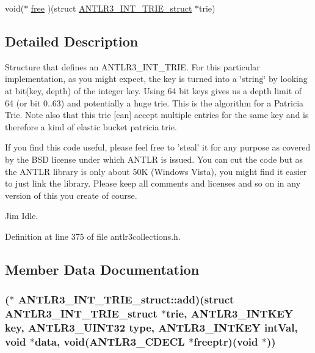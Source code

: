 \begin{DoxyCompactItemize}
\item 
void($\ast$ \hyperlink{struct_a_n_t_l_r3___i_n_t___t_r_i_e__struct_a3b80efe15e4309b61038feb16abc9e75}{free} )(struct \hyperlink{struct_a_n_t_l_r3___i_n_t___t_r_i_e__struct}{A\-N\-T\-L\-R3\-\_\-\-I\-N\-T\-\_\-\-T\-R\-I\-E\-\_\-struct} $\ast$trie)
\end{DoxyCompactItemize}


\subsection{Detailed Description}
Structure that defines an A\-N\-T\-L\-R3\-\_\-\-I\-N\-T\-\_\-\-T\-R\-I\-E. For this particular implementation, as you might expect, the key is turned into a \char`\"{}string\char`\"{} by looking at bit(key, depth) of the integer key. Using 64 bit keys gives us a depth limit of 64 (or bit 0..63) and potentially a huge trie. This is the algorithm for a Patricia Trie. Note also that this trie \mbox{[}can\mbox{]} accept multiple entries for the same key and is therefore a kind of elastic bucket patricia trie.

If you find this code useful, please feel free to 'steal' it for any purpose as covered by the B\-S\-D license under which A\-N\-T\-L\-R is issued. You can cut the code but as the A\-N\-T\-L\-R library is only about 50\-K (Windows Vista), you might find it easier to just link the library. Please keep all comments and licenses and so on in any version of this you create of course.

Jim Idle. 

Definition at line 375 of file antlr3collections.\-h.



\subsection{Member Data Documentation}
\hypertarget{struct_a_n_t_l_r3___i_n_t___t_r_i_e__struct_a2006080214d9c067e52d1e534c7a74f3}{
\subsubsection[{add}]{($\ast$ A\-N\-T\-L\-R3\-\_\-\-I\-N\-T\-\_\-\-T\-R\-I\-E\-\_\-struct\-::add)(struct {\bf A\-N\-T\-L\-R3\-\_\-\-I\-N\-T\-\_\-\-T\-R\-I\-E\-\_\-struct} $\ast$trie, {\bf A\-N\-T\-L\-R3\-\_\-\-I\-N\-T\-K\-E\-Y} key, {\bf A\-N\-T\-L\-R3\-\_\-\-U\-I\-N\-T32} {\bf type}, {\bf A\-N\-T\-L\-R3\-\_\-\-I\-N\-T\-K\-E\-Y} int\-Val, void $\ast$data, void({\bf A\-N\-T\-L\-R3\-\_\-\-C\-D\-E\-C\-L} $\ast$freeptr)(void $\ast$))}}\label{struct_a_n_t_l_r3___i_n_t___t_r_i_e__struct_a2006080214d9c067e52d1e534c7a74f3}


